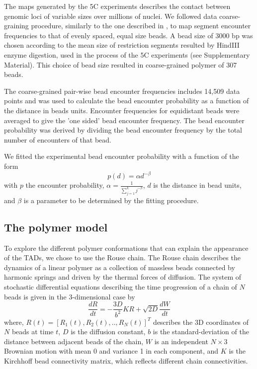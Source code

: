 \documentclass[12pt]{paper}
\begin{document}
The maps generated by the 5C experiments describes the contact between genomic loci of variable sizes over millions of nuclei. We followed data coarse-graining procedure, similarly to the one described in \cite{Giorgetti2014}, to map segment encounter frequencies to that of evenly spaced, equal size beads. A bead size of 3000 bp was chosen according to the mean size of restriction segments resulted by HindIII enzyme digestion, used in the process of the 5C experiments (see \cite{Giorgetti2014} Supplementary Material). This choice of bead size resulted in coarse-grained polymer of 307 beads. 

The coarse-grained pair-wise bead encounter frequencies includes 14,509 data points and was used to calculate the bead encounter probability as a function of the distance in beads units. Encounter frequencies for equidistant beads were averaged to give the 'one sided' bead encounter frequency. The bead encounter probability was derived by dividing the bead encounter frequency by the total number of encounters of that bead. 

We fitted the experimental bead encounter probability with a function of the form 
\begin{equation}\label{equation_encounterProbabilityModel}
p(d)=\alpha d^{-\beta}
\end{equation}
with $p$ the encounter probability, $\alpha = \frac{1}{\sum_{j=1}^k j^{-\beta}}$, $d$ is the distance in bead units, and $\beta$ is a parameter to be determined by the fitting procedure.


\subsection{The polymer model}\label{subsection_thePolymerModel}
To explore the different polymer conformations that can explain the appearance of the TADs, we chose to use the Rouse chain. The Rouse chain describes the dynamics of a linear polymer as a collection of massless beads connected by harmonic springs and driven by the thermal forces of diffusion. The system of stochastic differential equations describing the time progression of a chain of $N$ beads is given in the 3-dimensional case by
\begin{equation}
\frac{dR}{dt}=-\frac{3D}{b^2}KR +\sqrt{2D}\frac{dW}{dt}
\end{equation}
where, $R(t)=[R_1(t),R_2(t),..,R_N(t)]^T$ describes the 3D coordinates of $N$ beads at time $t$, $D$ is the diffusion constant, $b$ is the standard-deviation of the distance between adjacent beads of the chain, $W$ is an independent $N\times3$ Brownian motion with mean 0 and variance 1 in each component, and $K$ is the Kirchhoff bead connectivity matrix, which reflects different chain connectivities. 
\end{document}
